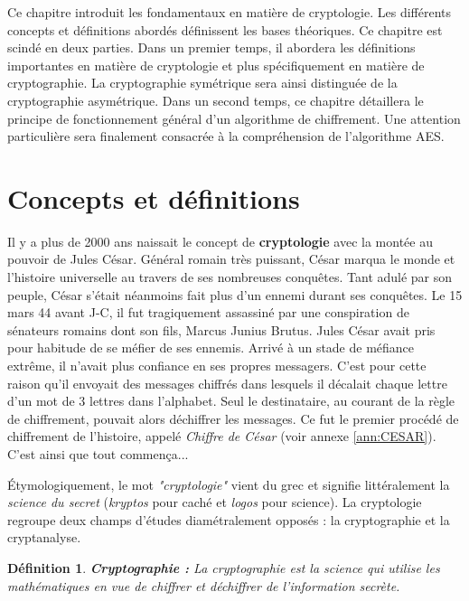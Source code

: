 \documentclass[oneside]{book}
\newtheorem{definition}{Définition}[section]
\begin{document}
Ce chapitre introduit les fondamentaux en matière de cryptologie. Les différents concepts et définitions abordés définissent les bases théoriques. Ce chapitre est scindé en deux parties. Dans un premier temps, il abordera les définitions importantes en matière de cryptologie et plus spécifiquement en matière de cryptographie. La cryptographie symétrique sera ainsi distinguée de la cryptographie asymétrique. Dans un second temps, ce chapitre détaillera le principe de fonctionnement général d'un algorithme de chiffrement. Une attention particulière sera finalement consacrée à la compréhension de l'algorithme AES.

\section{Concepts et définitions}
\label{sec:Concepts}

Il y a plus de 2000 ans naissait le concept de \textbf{cryptologie} avec la montée au pouvoir de Jules César. Général romain très puissant, César marqua le monde et l'histoire universelle au travers de ses nombreuses conquêtes. Tant adulé par son peuple, César s'était néanmoins fait plus d'un ennemi durant ses conquêtes. Le 15 mars 44 avant J-C, il fut tragiquement assassiné par une conspiration de sénateurs romains dont son fils, Marcus Junius Brutus. Jules César avait pris pour habitude de se méfier de ses ennemis. Arrivé à un stade de méfiance extrême, il n'avait plus confiance en ses propres messagers. C'est pour cette raison qu'il envoyait des messages chiffrés dans lesquels il décalait chaque lettre d'un mot de 3 lettres dans l'alphabet. Seul le destinataire, au courant de la règle de chiffrement, pouvait alors déchiffrer les messages. Ce fut le premier procédé de chiffrement de l'histoire, appelé \textit{Chiffre de César} (voir annexe \ref{ann:CESAR}). \\
C'est ainsi que tout commença...

Étymologiquement, le mot \textit{"cryptologie"} vient du grec et signifie littéralement la \textit{science du secret} (\textit{kryptos}  pour caché et \textit{logos} pour science). La cryptologie regroupe deux champs d'études diamétralement opposés : la cryptographie et la cryptanalyse.

\theoremstyle{definition}
\begin{definition}{\textbf{Cryptographie : }}
La cryptographie est la science qui utilise les mathématiques en vue de chiffrer et déchiffrer de l'information secrète.
\end{definition}
\end{document}
